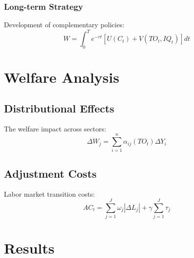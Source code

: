 \documentclass[12pt,a4paper]{article}
\theoremstyle{definition}
\begin{document}
\subsubsection{Long-term Strategy}
Development of complementary policies:
\begin{equation}
W = \int_0^T e^{-rt}[U(C_t) + V(TO_t, IQ_t)]dt
\end{equation}

\section{Welfare Analysis}
\subsection{Distributional Effects}
The welfare impact across sectors:
\begin{equation}
\Delta W_j = \sum_{i=1}^n \alpha_{ij}(TO_t)\Delta Y_i
\end{equation}

\subsection{Adjustment Costs}
Labor market transition costs:
\begin{equation}
AC_t = \sum_{j=1}^J \omega_j|\Delta L_j| + \gamma \sum_{j=1}^J \tau_j
\end{equation}

\section{Results}
\end{document}
